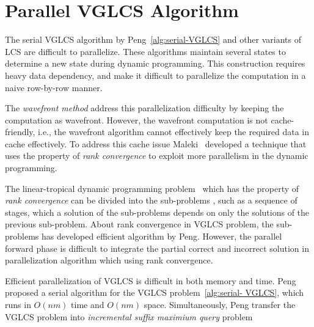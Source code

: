 \section{Parallel VGLCS Algorithm} %
\label{sec:parallelVGLCS}

The serial VGLCS algorithm by Peng~\ref{alg:serial-VGLCS} and other
variants of LCS are difficult to parallelize.  These algorithms
maintain several states to determine a new state during dynamic
programming.  This construction requires heavy data dependency, and
make it difficult to parallelize the computation in a naive row-by-row
manner.

The {\em wavefront method} address this parallelization difficulty by
keeping the computation as wavefront.  However, the wavefront
computation is not cache-friendly, i.e., the wavefront algorithm cannot
effectively keep the required data in cache effectively.  To address
this cache issue Maleki~\cite{Maleki2016EfficientPU} developed a
technique that uses the property of {\em rank convergence} to exploit
more parallelism in the dynamic programming.  

The linear-tropical dynamic programming
problem~\cite{Maleki2016EfficientPU} which has the property of {\em rank
convergence} can be divided into the sub-problems , such as a sequence
of stages, which a solution of the sub-problems depends on only the
solutions of the previous sub-problem.  About rank convergence in VGLCS
problem, the sub-problems has developed efficient algorithm by Peng.
However, the parallel forward phase is difficult to integrate the partial
correct and incorrect solution in parallelization algorithm which using
rank convergence.


\iffalse
在 $O(nm \alpha(n))$ 的序列算法 \ref{alg:serial-VGLCS} 中，
我們發現算法如大多數的變型 LCS 相同，依賴數個狀態以轉移當前狀態，
大量的資料依賴性不易於細粒度平行。使用波前運行平行是一種常見的解決方案，
由於這種平行對於運行時的快取不友善 (cache-unfriendly)，
在 Saeed Maleki ~\cite{saeed} 論文中提到如何使用 Rank Convergence 的特殊性質，
拓展出更高平行度來解決動態規劃的相關問題。
\fi




Efficient parallelization of VGLCS is difficult in both memory and time.
Peng proposed a serial algorithm for the VGLCS problem~\ref{alg:serial-
VGLCS}, which runs in $O(nm)$ time and $O(nm)$ space.  Simultaneously,
Peng transfer the VGLCS problem into {\em incremental suffix maximium
query} problem

